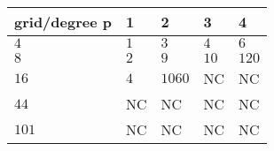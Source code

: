 \begin{tabular}{lllll}
\hline
 grid/degree p   & 1   & 2      & 3    & 4     \\
\hline
 $4$             & $1$ & $3$    & $4$  & $6$   \\
 $8$             & $2$ & $9$    & $10$ & $120$ \\
 $16$            & $4$ & $1060$ & NC   & NC    \\
 $44$            & NC  & NC     & NC   & NC    \\
 $101$           & NC  & NC     & NC   & NC    \\
\hline
\end{tabular}